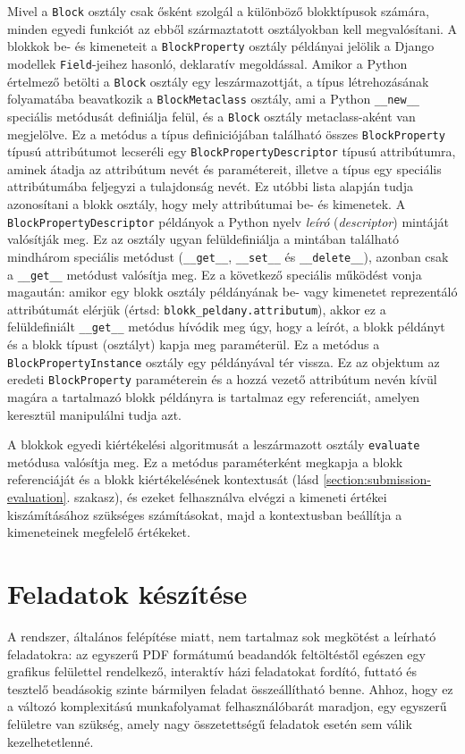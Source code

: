 Mivel a \texttt{Block} osztály csak ősként szolgál a különböző blokktípusok számára, minden egyedi funkciót az ebből származtatott osztályokban kell megvalósítani.
A blokkok be- és kimeneteit a \texttt{Block\-Property} osztály példányai jelölik a Django modellek \texttt{Field}-jeihez hasonló, deklaratív megoldással.
Amikor a Python értelmező betölti a \texttt{Block} osztály egy leszármazottját, a típus létrehozásának folyamatába beavatkozik a \texttt{Block\-Metaclass} osztály, ami a Python \texttt{\_\_new\_\_} speciális metódusát definiálja felül, és a \texttt{Block} osztály meta\-class-aként van megjelölve. \cite{PythonMetaclass}
Ez a metódus a típus definiciójában található összes \texttt{Block\-Property} típusú attribútumot lecseréli egy \texttt{Block\-Property\-Descriptor} típusú attribútumra, aminek átadja az attribútum nevét és paramétereit, illetve a típus egy speciális attribútumába feljegyzi a tulajdonság nevét.
Ez utóbbi lista alapján tudja azonosítani a blokk osztály, hogy mely attribútumai be- és kimenetek.
A \texttt{Block\-Property\-Descriptor} példányok a Python nyelv \textit{leíró} (\textit{descriptor}) mintáját valósítják meg.
Ez az osztály ugyan felüldefiniálja a mintában található mindhárom speciális metódust (\texttt{\_\_get\_\_}, \texttt{\_\_set\_\_} és \texttt{\_\_delete\_\_}), azonban csak a \texttt{\_\_get\_\_} metódust valósítja meg.
Ez a következő speciális működést vonja magaután: amikor egy blokk osztály példányának be- vagy kimenetet reprezentáló attribútumát elérjük (értsd: \texttt{blokk\_peldany.attributum}), akkor ez a felüldefiniált \texttt{\_\_get\_\_} metódus hívódik meg úgy, hogy a leírót, a blokk példányt és a blokk típust (osztályt) kapja meg paraméterül. \cite{PythonDescriptors}
Ez a metódus a \texttt{Block\-Property\-Instance} osztály egy példányával tér vissza.
Ez az objektum az eredeti \texttt{Block\-Property} paraméterein és a hozzá vezető attribútum nevén kívül magára a tartalmazó blokk példányra is tartalmaz egy referenciát, amelyen keresztül manipulálni tudja azt.

A blokkok egyedi kiértékelési algoritmusát a leszármazott osztály \texttt{evaluate} metódusa valósítja meg.
Ez a metódus paraméterként megkapja a blokk referenciáját és a blokk kiértékelésének kontextusát (lásd \ref{section:submission-evaluation}. szakasz), és ezeket felhasználva elvégzi a kimeneti értékei kiszámításához szükséges számításokat, majd a kontextusban beállítja a kimeneteinek megfelelő értékeket.

\section{Feladatok készítése}
A rendszer, általános felépítése miatt, nem tartalmaz sok megkötést a leírható feladatokra: az egyszerű PDF formátumú beadandók feltöltéstől egészen egy grafikus felülettel rendelkező, interaktív házi feladatokat fordító, futtató és tesztelő beadásokig szinte bármilyen feladat összeállítható benne.
Ahhoz, hogy ez a változó komplexitású munkafolyamat felhasználóbarát maradjon, egy egyszerű felületre van szükség, amely nagy összetettségű feladatok esetén sem válik kezelhetetlenné.

